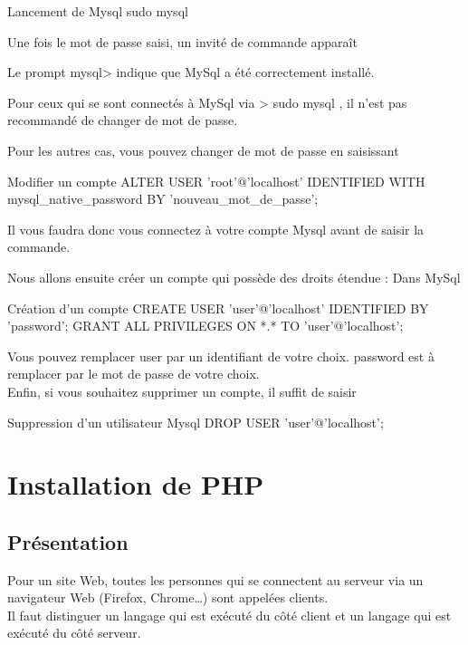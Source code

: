 {\begin{Bash}{Lancement de Mysql}
sudo mysql
\end{Bash}

Une fois le mot de passe saisi, un invité de commande apparaît

Le prompt mysql> indique que MySql a été correctement installé.

Pour ceux qui se sont connectés à MySql via > sudo mysql , il n’est pas recommandé de changer de mot de passe.

Pour les autres cas, vous pouvez changer de mot de passe en saisissant 
\begin{Bash}{Modifier un compte}
ALTER USER 'root'@'localhost' IDENTIFIED WITH mysql_native_password BY 'nouveau_mot_de_passe';
\end{Bash}

Il vous faudra donc vous connectez à votre compte Mysql avant de saisir la commande. 


Nous allons ensuite créer un compte qui possède des droits étendue :
Dans MySql \\


\begin{Bash}{Création d'un compte}
CREATE USER 'user'@'localhost' IDENTIFIED BY 'password';
GRANT ALL PRIVILEGES ON *.* TO 'user'@'localhost';
\end{Bash}


Vous pouvez remplacer user par un identifiant de votre choix.
password est à remplacer par le mot de passe de votre choix. \\

Enfin, si vous souhaitez supprimer un compte, il suffit de saisir
\begin{Bash}{Suppression d'un utilisateur Mysql}
DROP USER 'user'@'localhost';
\end{Bash}\chapter{Installation de PHP}

\section{Présentation}
Pour un site Web, toutes les personnes qui se connectent au serveur via un navigateur Web (Firefox, Chrome…) sont appelées clients. \\
Il faut distinguer un langage qui est exécuté du côté client et un langage qui est exécuté du côté serveur. \\

}
